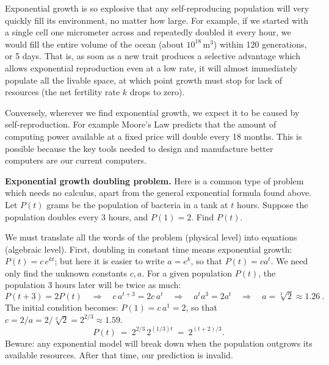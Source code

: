 \documentclass[11pt]{article}
\begin{document}
Exponential growth is so explosive that any self-reproducing population 
will very quickly fill its environment, no matter how large. 
For example, if we started with a single cell one micrometer across and 
repeatedly doubled it every hour, we would fill the entire volume of 
the ocean (about $10^{18}\, \mathrm{m}^3$) within 120 generations,
or 5 days. 
That is, as soon as a new trait produces a selective advantage
which allows exponential reproduction even at a low rate, 
it will almost immediately populate all the livable space, at which point
growth must stop for lack of resources (the net fertility rate $k$ drops to zero).

Conversely, wherever we find exponential growth, we expect it to be caused by 
self-reproduction. For example Moore's Law 
predicts that the amount of computing power available at a fixed price
will double every 18 months.
This is possible because the key tools needed to design and manufacture
better computers are our current computers.

\newpage

\noindent
{\bf Exponential growth doubling problem.}
Here is a common type of problem which needs no calculus,
apart from the general exponential formula found above.
Let $P(t)$ grams be the population of bacteria in a tank at $t$ hours. Suppose the population doubles every 3 hours, and $P(1)=2$. Find $P(t)$.

We must translate all the words of the problem (physical level) into equations (algebraic level). First, doubling in constant time means exponential growth: $P(t)=c\, e^{kt}$; but here it is easier to write $a=e^k$, so that $P(t)=ca^t$. We need only find the unknown constants $c,a$. For a given population $P(t)$, the population 3 hours later will be twice as much:
$$
P(t{+}3) = 2 P(t) 
\quad \Longrightarrow \quad
c\,a^{t+3} = 2c\,a^t
\quad \Longrightarrow \quad
a^t a^3 = 2a^t
\quad \Longrightarrow \quad
a= \sqrt[3]{2} \approx 1.26\ .
$$ 
The initial condition becomes: $P(1)=c\,a^1=2$, so that $c = 2/a = 2/\sqrt[3]2 = 2^{2/3}\approx 1.59$.
$$
P(t) \ =\ 2^{2/3}\, 2^{(1/3)t} \ =\ 2^{(t+2)/3}.
$$
Beware: any exponential model will break down when the population outgrows its available resources. After that time, our prediction is invalid.
\end{document}
